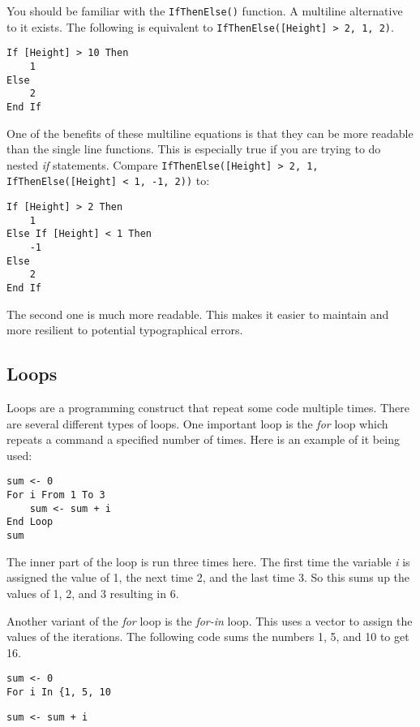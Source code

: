 \documentclass[]{memoir}
\begin{document}
You should be familiar with the \lstinline!IfThenElse()! function. A
multiline alternative to it exists. The following is equivalent to
\lstinline!IfThenElse([Height] > 2, 1, 2)!.

\begin{lstlisting}
If [Height] > 10 Then
    1
Else
    2
End If
\end{lstlisting}

One of the benefits of these multiline equations is that they can be
more readable than the single line functions. This is especially true if
you are trying to do nested \emph{if} statements. Compare
\lstinline!IfThenElse([Height] > 2, 1, IfThenElse([Height] < 1, -1, 2))!
to:

\begin{lstlisting}
If [Height] > 2 Then
    1
Else If [Height] < 1 Then
    -1
Else
    2
End If
\end{lstlisting}

The second one is much more readable. This makes it easier to maintain
and more resilient to potential typographical errors.

\subsection{Loops}

Loops are a programming construct that repeat some code multiple times.
There are several different types of loops. One important loop is the
\emph{for} loop which repeats a command a specified number of times.
Here is an example of it being used:

\begin{lstlisting}
sum <- 0
For i From 1 To 3
    sum <- sum + i
End Loop
sum
\end{lstlisting}

The inner part of the loop is run three times here. The first time the
variable \emph{i} is assigned the value of 1, the next time 2, and the
last time 3. So this sums up the values of 1, 2, and 3 resulting in 6.

Another variant of the \emph{for} loop is the \emph{for-in} loop. This
uses a vector to assign the values of the iterations. The following code
sums the numbers 1, 5, and 10 to get 16.

\begin{lstlisting}
sum <- 0
For i In {1, 5, 10
\end{lstlisting}

\begin{lstlisting}
sum <- sum + i
\end{lstlisting}
\end{document}
